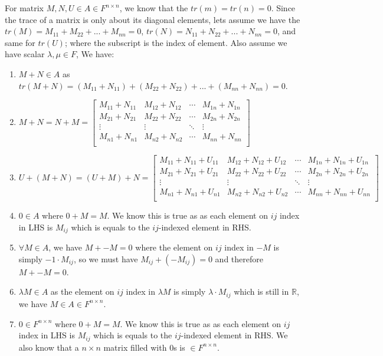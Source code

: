 \documentclass[11pt]{article}
\begin{document}
For matrix $M, N, U \in A \in F^{n \times n}$, we know that the $tr(m) = tr(n) = 0$. Since the trace of a matrix is only about its diagonal elements, lets assume we have the $tr(M) = M_{11} + M_{22} + ... +  M_{nn} = 0$, $tr(N) = N_{11} + N_{22} + ... +  N_{nn} = 0$, and same for $tr(U)$; where the subscript is the index of element. Also assume we have scalar $\lambda, \mu \in F$, We have:

\begin{enumerate}
    \item $M + N \in A$ as $tr(M + N) = (M_{11} + N_{11}) + (M_{22} + N_{22}) +  ... + (M_{nn} + N_{nn}) = 0$.
    \item $M + N = N + M = \begin{bmatrix}
        M_{11} + N_{11} & M_{12} + N_{12} & \cdots &M_{1n} + N_{1n} \\
        M_{21} + N_{21} & M_{22} + N_{22} & \cdots &M_{2n} + N_{2n} \\
        \vdots & \vdots & \ddots & \vdots \\
        M_{n1} + N_{n1} & M_{n2} + N_{n2} & \cdots &M_{nn} + N_{nn} \\
    \end{bmatrix}$
    \item $U + (M + N) = (U + M) + N = \begin{bmatrix}
        M_{11} + N_{11}+ U_{11} & M_{12} + N_{12}+ U_{12} & \cdots & M_{1n} + N_{1n}+ U_{1n} \\
        M_{21} + N_{21} + U_{21} & M_{22} + N_{22} + U_{22} & \cdots&  M_{2n} + N_{2n} + U_{2n} \\
        \vdots & \vdots & \ddots & \vdots \\
        M_{n1} + N_{n1}+U_{n1} & M_{n2} + N_{n2}+U_{n2} & \cdots & M_{nn} + N_{nn}+U_{nn} \\
    \end{bmatrix}$
    \item $0 \in A$ where $0 + M = M$. We know this is true as as each element on $ij$ index in LHS is $M_{ij}$ which is equals to the $ij$-indexed element in RHS.
    \item $\forall M \in A$, we have $M + -M = 0$ where the element on $ij$ index in $-M$ is simply $-1 \cdot M_{ij}$, so we must have $M_{ij} + (-M_{ij}) = 0$ and therefore $M + -M = 0$.
    \item $\lambda M \in A$ as the element on $ij$ index in $\lambda M$ is simply $\lambda \cdot M_{ij}$ which is still in $\mathbb{R}$, we have $M \in A \in F^{n \times n}$.
    \item $0 \in  F^{n \times n}$ where $0 + M = M$. We know this is true as as each element on $ij$ index in LHS is $M_{ij}$ which is equals to the $ij$-indexed element in RHS. We also know that a $n \times n$ matrix filled with $0$s is $\in  F^{n \times n}$.

\end{enumerate}
\end{document}
